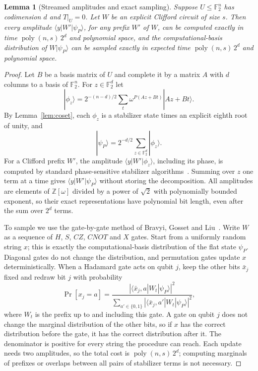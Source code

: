 \documentclass[a4paper,onecolumn,11pt,unpublished]{quantumarticle}
\theoremstyle{plain}
\newtheorem{lemma}[theorem]{Lemma}
\theoremstyle{remark}
\newcommand{\F}{\mathbb{F}_2}
\newcommand{\Z}{\mathbb{Z}}
\newcommand{\ket}[1]{|#1\rangle}
\newcommand{\bra}[1]{\langle #1|}
\DeclareMathOperator{\poly}{poly}
\begin{document}
\begin{lemma}[Streamed amplitudes and exact sampling]\label{lem:sampling}
Suppose $U\le\F^n$ has codimension $d$ and $T|_U=0$. Let $W$ be an explicit Clifford circuit of size $s$. Then every amplitude $\bra{y}W'\ket{\psi_P}$, for any prefix $W'$ of $W$, can be computed exactly in time $\poly(n,s)\,2^d$ and polynomial space, and the computational-basis distribution of $W\ket{\psi_P}$ can be sampled exactly in expected time $\poly(n,s)\,2^d$ and polynomial space.
\end{lemma}

\begin{proof}
Let $B$ be a basis matrix of $U$ and complete it by a matrix $A$ with $d$ columns to a basis of $\F^n$. For $z\in\F^d$ let
\[
\ket{\phi_z}=2^{-(n-d)/2}\sum_{t}\omega^{P(Az+Bt)}\ket{Az+Bt}.
\]
By Lemma~\ref{lem:coset}, each $\phi_z$ is a stabilizer state times an explicit eighth root of unity, and
\begin{equation}\label{eq:decomposition}
\ket{\psi_P}=2^{-d/2}\sum_{z\in\F^d}\ket{\phi_z}.
\end{equation}
For a Clifford prefix $W'$, the amplitude $\bra{y}W'\ket{\phi_z}$, including its phase, is computed by standard phase-sensitive stabilizer algorithms~\cite{DD03,BBC19}. Summing over $z$ one term at a time gives $\bra{y}W'\ket{\psi_P}$ without storing the decomposition. All amplitudes are elements of $\Z[\omega]$ divided by a power of $\sqrt2$ with polynomially bounded exponent, so their exact representations have polynomial bit length, even after the sum over $2^d$ terms.

To sample we use the gate-by-gate method of Bravyi, Gosset and Liu~\cite{BGL22}. Write $W$ as a sequence of $H$, $S$, $CZ$, $CNOT$ and $X$ gates. Start from a uniformly random string $x$; this is exactly the computational-basis distribution of the flat state $\psi_P$. Diagonal gates do not change the distribution, and permutation gates update $x$ deterministically. When a Hadamard gate acts on qubit $j$, keep the other bits $\bar x_j$ fixed and redraw bit $j$ with probability
\[
\Pr[x_j=a]=\frac{|\bra{\bar x_j,a}W_t\ket{\psi_P}|^2}{\sum_{a'\in\{0,1\}}|\bra{\bar x_j,a'}W_t\ket{\psi_P}|^2},
\]
where $W_t$ is the prefix up to and including this gate. A gate on qubit $j$ does not change the marginal distribution of the other bits, so if $x$ has the correct distribution before the gate, it has the correct distribution after it. The denominator is positive for every string the procedure can reach. Each update needs two amplitudes, so the total cost is $\poly(n,s)\,2^d$; computing marginals of prefixes or overlaps between all pairs of stabilizer terms is not necessary.


\end{proof}
\end{document}
